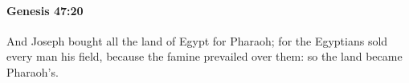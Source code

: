 
		\paragraph{Genesis 47:20} %
			\label{GENESIS-47-20}

			And Joseph bought all the land of Egypt for Pharaoh; for the Egyptians sold every man his field, because the famine prevailed over them: so the land became Pharaoh's.


